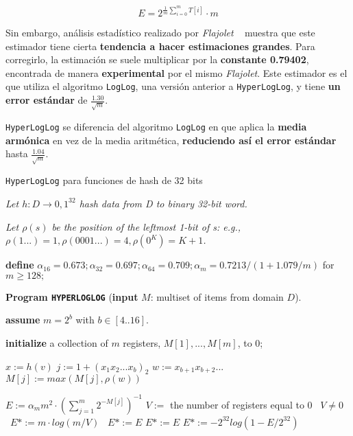 $$ E = 2 ^ { \frac{1}{m} \sum\limits_{i=0}^{m}\! T[i] } \cdot m $$

Sin embargo, análisis estadístico realizado por \emph{Flajolet} ~\cite{hll:HyperLogLog} muestra que este estimador
tiene cierta \textbf{tendencia a hacer estimaciones grandes}. Para corregirlo, la estimación se suele multiplicar por la
\textbf{constante 0.79402}, encontrada de manera \textbf{experimental} por el mismo \emph{Flajolet}.
Este estimador es el que utiliza el algoritmo \texttt{LogLog}, una versión anterior a \texttt{HyperLogLog}, y tiene
\textbf{un error estándar} de  $\frac{1.30}{\sqrt{m}}$.

\texttt{HyperLogLog} se diferencia del algoritmo \texttt{LogLog} en que aplica la \textbf{media armónica} en vez de la
media aritmética, \textbf{reduciendo así el error estándar} hasta $\frac{1.04}{\sqrt{m}}$.

\begin{algorithm}[h]
\caption{\texttt{HyperLogLog} para funciones de hash de 32 bits}
\textit{Let $h: D\rightarrow{0,1}^{32}$ hash data from D to binary 32-bit word.}

\textit{Let $\rho(s)$ be the position of the leftmost 1-bit of s: e.g.,
$\rho(1...) = 1, \rho(0001...) = 4, \rho(0^K) = K + 1$.}

\textbf{define} $\alpha_{16}=0.673;\alpha_{32}=0.697;\alpha_{64}=0.709;\alpha_m=0.7213/(1+1.079/m)$
for $m \geq 128;$

\textbf{Program \texttt{HYPERLOGLOG}} (\textbf{input} $M$: multiset of items from domain $D$).

\textbf{assume} $m=2^b$ with $ b\in[4..16]$.

\textbf{initialize} a collection of $m$ registers, $M[1],...,M[m]$, to 0;

\begin{algorithmic}
            \STATE $x  := h(v)$
            \STATE $j   := 1 + (x_1 x_2 ... x_b)_2$ 
            \STATE $w := x_{b+1} x_{b+2} ... $
            \STATE $M[j] := max(M[j],\rho(w))$
    \ENDFOR

    \STATE $E:=\alpha _m m^2·\left(\sum\limits_{j=1}^m 2^{-M[j]}\right)^{-1}$ 
        \STATE $V :=$ the number of registers equal to $0$
        \STATE \algorithmicif\ $V \neq 0$ \algorithmicthen\ $E* := m \cdot log(m / V)$ \algorithmicelse\ $E* := E$
    \ENDIF
        \STATE $E*:=E$ 
    \ELSE
        \STATE $E* := -2^{32}log(1-E/2^{32})$ 
    \ENDIF
\end{algorithmic}
\end{algorithm}


